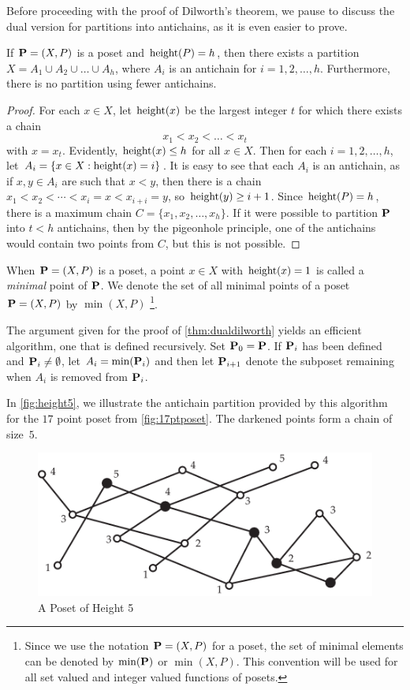 Before proceeding with the proof of Dilworth's theorem, we pause to
discuss the dual version for partitions into antichains, as it is
even easier to prove.

\begin{theorem}\label{thm:dualdilworth}
If $\mathbf{P}=(X,P)$ is a poset and $\operatorname{height}(P)=h$,
then there exists a partition $X=A_1\cup A_2\cup\dots\cup A_h$, where
$A_i$ is an antichain for $i=1,2,\dots,h$. Furthermore, there is no
partition using fewer antichains.
\end{theorem}

\begin{proof}
For each $x\in X$, let $\operatorname{height}(x)$ be the largest integer $t$ for
which there exists a chain \[x_1<x_2<\dots < x_t\] with $x=x_t$.
Evidently, $\operatorname{height}(x)\le h$ for all $x\in X$.  Then for each
$i=1,2,\dots,h$, let $A_i=\{x\in X:\operatorname{height}(x)=i\}$.  It is easy to
see that each $A_i$ is an antichain, as if $x,y\in A_i$ are such
that $x<y$, then there is a chain $x_1<x_2<\cdots<x_i=x <
x_{i+i}=y$, so $\operatorname{height}(y)\ge i+1$. Since $\operatorname{height}(P)=h$, there is a
maximum chain $C=\{x_1,x_2,\dots,x_h\}$. If it were possible to
partition $\mathbf{P}$ into $t<h$ antichains, then by the pigeonhole
principle, one of the antichains would contain two points from $C$,
but this is not possible.
\end{proof}

When $\mathbf{P}=(X,P)$ is a poset, a point $x\in X$ with $\operatorname{height}(x)=1$ is 
called a \textit{minimal} point of $\mathbf{P}$.  We denote the set of all minimal
points of a poset $\mathbf{P}=(X,P)$ by $\min(X,P)$ \footnote{Since we use the
notation $\mathbf{P}= (X,P)$ for a poset, the set of minimal elements can
be denoted by $ \min(\mathbf{P})$ or $\min(X,P)$. This convention will be
used for all set valued and integer valued functions of posets.}.

The argument given for the proof of \autoref{thm:dualdilworth} yields
an efficient algorithm, one that is defined recursively.  Set $\mathbf{P}_0=
\mathbf{P}$.  If $\mathbf{P}_i$ has been defined and $\mathbf{P}_i\neq \emptyset$, let
$A_i=\min(\mathbf{P}_i)$ and then let $\mathbf{P}_{i+1}$ denote the subposet remaining
when $A_i$ is removed from $\mathbf{P}_i$.

In \autoref{fig:height5}, we illustrate the antichain partition
provided by this algorithm for the $17$ point poset from \autoref{fig:17ptposet}.  
The darkened points form a chain of size~$5$. 

\begin{figure}
\begin{center}
\includegraphics*[scale=.4]{posets-figs/height5}
\caption{A Poset of Height 5}
\label{fig:height5}
\end{center}
\end{figure}

